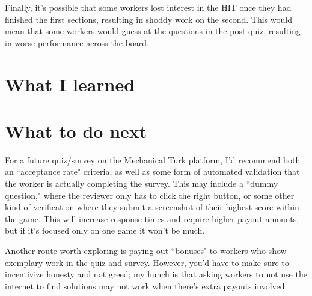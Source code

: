 \documentclass[12pt]{report}
\begin{document}
		Finally, it's possible that some workers lost interest in the HIT once they had finished the first sections, resulting in shoddy work on the second. This would mean that some workers would guess at the questions in the post-quiz, resulting in worse performance across the board.
	\section{What I learned}
	\section{What to do next}
		For a future quiz/survey on the Mechanical Turk platform, I'd recommend both an ``acceptance rate" criteria, as well as some form of automated validation that the worker is actually completing the survey. This may include a ``dummy question," where the reviewer only has to click the right button, or some other kind of verification where they submit a screenshot of their highest score within the game. This will increase response times and require higher payout amounts, but if it's focused only on one game it won't be much.

		Another route worth exploring is paying out ``bonuses" to workers who show exemplary work in the quiz and survey. However, you'd have to make sure to incentivize honesty and not greed; my hunch is that asking workers to not use the internet to find solutions may not work when there's extra payouts involved.
\end{document}
